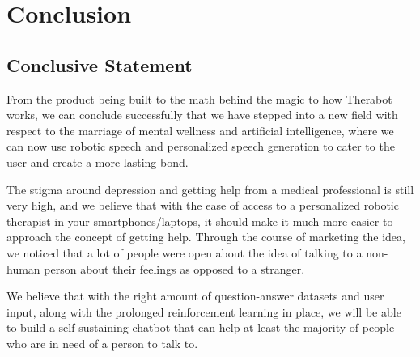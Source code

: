 \chapter{Conclusion}

\pagebreak

\section{Conclusive Statement}

From the product being built to the math behind the magic to how Therabot works, we can conclude successfully that we have stepped into a new field with respect to the marriage of mental wellness and artificial intelligence, where we can now use robotic speech and personalized speech generation to cater to the user and create a more lasting bond.

The stigma around depression and getting help from a medical professional is still very high, and we believe that with the ease of access to a personalized robotic therapist in your smartphones/laptops, it should make it much more easier to approach the concept of getting help. Through the course of marketing the idea, we noticed that a lot of people were open about the idea of talking to a non-human person about their feelings as opposed to a stranger.

We believe that with the right amount of question-answer datasets and user input, along with the prolonged reinforcement learning in place, we will be able to build a self-sustaining chatbot that can help at least the majority of people who are in need of a person to talk to.
